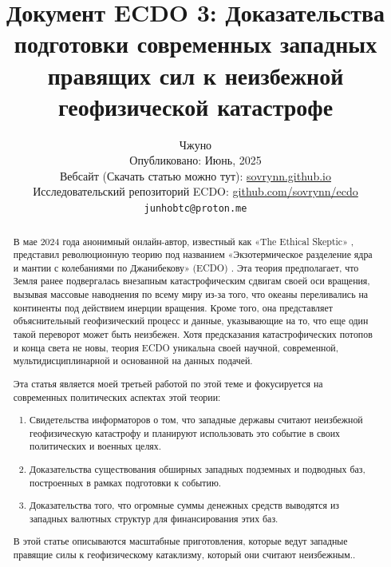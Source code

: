 \documentclass[10pt,twocolumn,letterpaper]{article}
\begin{document}
\title{Документ ECDO 3: Доказательства подготовки современных западных правящих сил к неизбежной геофизической катастрофе}

\author{Чжуно\\
Опубликовано: Июнь, 2025\\
Вебсайт (Скачать статью можно тут): \href{https://sovrynn.github.io}{sovrynn.github.io}\\
Исследовательский репозиторий ECDO: \href{https://github.com/sovrynn/ecdo}{github.com/sovrynn/ecdo}\\
{\tt\small junhobtc@proton.me}
}

\maketitle

\begin{abstract}
В мае 2024 года анонимный онлайн-автор, известный как «The Ethical Skeptic» \cite{0}, представил революционную теорию под названием «Экзотермическое разделение ядра и мантии с колебаниями по Джанибекову» (ECDO) \cite{1}. Эта теория предполагает, что Земля ранее подвергалась внезапным катастрофическим сдвигам своей оси вращения, вызывая массовые наводнения по всему миру из-за того, что океаны переливались на континенты под действием инерции вращения. Кроме того, она представляет объяснительный геофизический процесс и данные, указывающие на то, что еще один такой переворот может быть неизбежен. Хотя предсказания катастрофических потопов и конца света не новы, теория ECDO уникальна своей научной, современной, мультидисциплинарной и основанной на данных подачей.

Эта статья является моей третьей работой \cite{2,3} по этой теме и фокусируется на современных политических аспектах этой теории:
\begin{flushleft}
\begin{enumerate}
    \item Свидетельства информаторов о том, что западные державы считают неизбежной геофизическую катастрофу и планируют использовать это событие в своих политических и военных целях.
    \item Доказательства существования обширных западных подземных и подводных баз, построенных в рамках подготовки к событию.
    \item Доказательства того, что огромные суммы денежных средств выводятся из западных валютных структур для финансирования этих баз.
\end{enumerate}
\end{flushleft}

В этой статье описываются масштабные приготовления, которые ведут западные правящие силы к геофизическому катаклизму, который они считают неизбежным..
\end{abstract}
\end{document}
